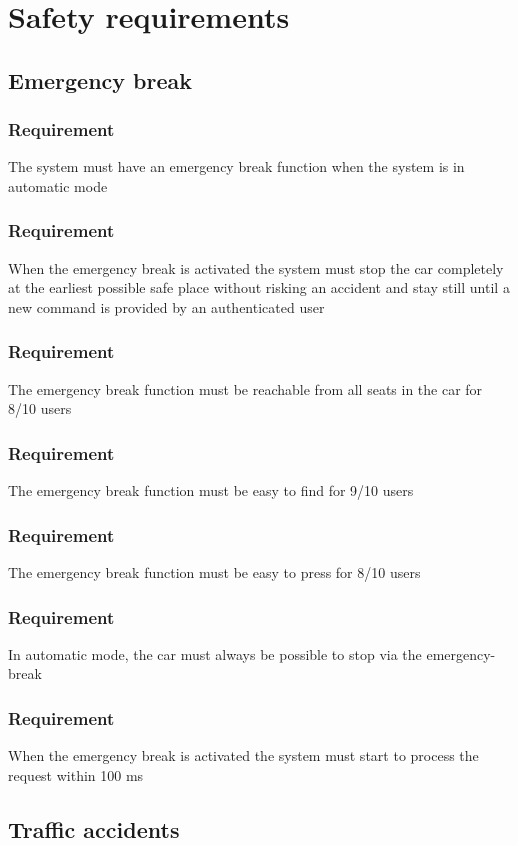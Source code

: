 \documentclass{article}
\begin{document}
\section{Safety requirements}
  \subsection{Emergency break}
      \subsubsection{Requirement}
\hfill \break 
\- \- \-The system must have an emergency break function when the system is in automatic mode
      \subsubsection{Requirement}
\hfill \break 
\- \- \-When the emergency break is activated the system must stop the car completely at the earliest possible safe place without risking an accident and stay still until a new command is provided by an authenticated user
      \subsubsection{Requirement}
\hfill \break 
\- \- \-The emergency break function must be reachable from all seats in the car for 8/10 users
      \subsubsection{Requirement}
\hfill \break 
\- \- \-The emergency break function must be easy to find for 9/10 users
      \subsubsection{Requirement}
\hfill \break 
\- \- \-The emergency break function must be easy to press for 8/10 users
      \subsubsection{Requirement}
\hfill \break 
\- \- \-In automatic mode, the car must always be possible to stop via the emergency-break
      \subsubsection{Requirement}
\hfill \break 
\- \- \-When the emergency break is activated the system must start to process the request within 100 ms
  \subsection{Traffic accidents}
\end{document}
